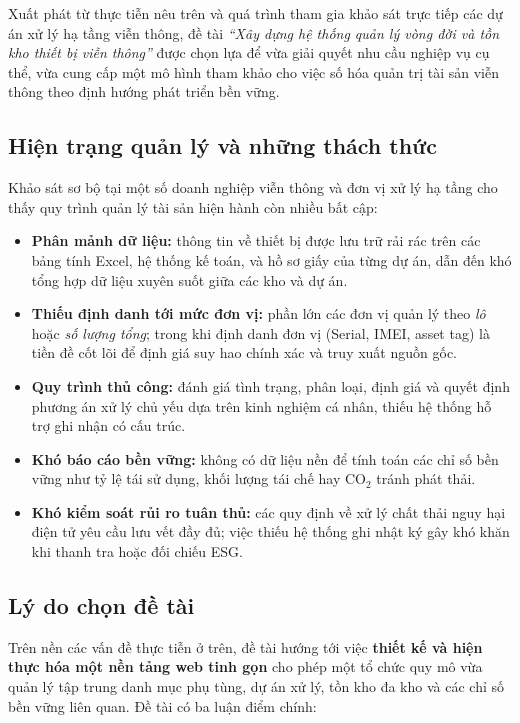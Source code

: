 Xuất phát từ thực tiễn nêu trên và quá trình tham gia khảo sát trực tiếp các dự án xử lý hạ tầng viễn thông, đề tài \textit{``Xây dựng hệ thống quản lý vòng đời và tồn kho thiết bị viễn thông''} được chọn lựa để vừa giải quyết nhu cầu nghiệp vụ cụ thể, vừa cung cấp một mô hình tham khảo cho việc số hóa quản trị tài sản viễn thông theo định hướng phát triển bền vững.

\subsection{Hiện trạng quản lý và những thách thức}
Khảo sát sơ bộ tại một số doanh nghiệp viễn thông và đơn vị xử lý hạ tầng cho thấy quy trình quản lý tài sản hiện hành còn nhiều bất cập:

\begin{itemize}[leftmargin=1.2cm]
    \item \textbf{Phân mảnh dữ liệu:} thông tin về thiết bị được lưu trữ rải rác trên các bảng tính Excel, hệ thống kế toán, và hồ sơ giấy của từng dự án, dẫn đến khó tổng hợp dữ liệu xuyên suốt giữa các kho và dự án.
    \item \textbf{Thiếu định danh tới mức đơn vị:} phần lớn các đơn vị quản lý theo \emph{lô} hoặc \emph{số lượng tổng}; trong khi định danh đơn vị (Serial, IMEI, asset tag) là tiền đề cốt lõi để định giá suy hao chính xác và truy xuất nguồn gốc.
    \item \textbf{Quy trình thủ công:} đánh giá tình trạng, phân loại, định giá và quyết định phương án xử lý chủ yếu dựa trên kinh nghiệm cá nhân, thiếu hệ thống hỗ trợ ghi nhận có cấu trúc.
    \item \textbf{Khó báo cáo bền vững:} không có dữ liệu nền để tính toán các chỉ số bền vững như tỷ lệ tái sử dụng, khối lượng tái chế hay CO$_2$ tránh phát thải.
    \item \textbf{Khó kiểm soát rủi ro tuân thủ:} các quy định về xử lý chất thải nguy hại điện tử yêu cầu lưu vết đầy đủ; việc thiếu hệ thống ghi nhật ký gây khó khăn khi thanh tra hoặc đối chiếu ESG.
\end{itemize}

\subsection{Lý do chọn đề tài}
Trên nền các vấn đề thực tiễn ở trên, đề tài hướng tới việc \textbf{thiết kế và hiện thực hóa một nền tảng web tinh gọn} cho phép một tổ chức quy mô vừa quản lý tập trung danh mục phụ tùng, dự án xử lý, tồn kho đa kho và các chỉ số bền vững liên quan. Đề tài có ba luận điểm chính:

